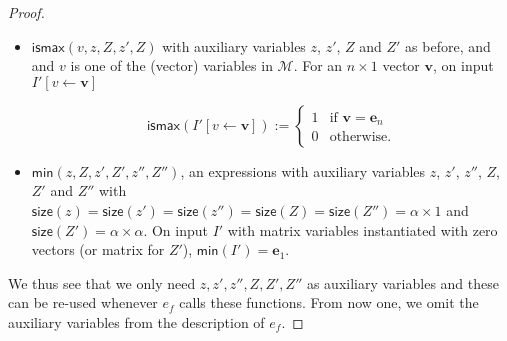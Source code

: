 \begin{proof}
\begin{itemize}
	\item $\textsf{ismax}(v,z,Z,z',Z)$ with auxiliary variables $z$, $z'$, $Z$ and $Z'$ as before, and 
	and $v$ is one of the (vector) variables in $\mathcal{M}$. For an $n\times 1$ vector $\mathbf{v}$, 
	on input $I'[v\gets \mathbf{v}]$
	
	$$\mathsf{ismax}(I'[v\gets\mathbf{v}]):=\begin{cases} 1 & \text{if $\mathbf{v}=\mathbf{e}_{n}$}\\
		0 & \text{otherwise}.
		\end{cases}$$
	\item $\mathsf{min}(z,Z,z',Z',z'',Z'')$, an expressions with
	auxiliary variables $z$, $z'$, $z''$, $Z$, $Z'$ and $Z''$ with 
	$\mathsf{size}(z)=\mathsf{size}(z')=\mathsf{size}(z'')=\mathsf{size}(Z)=\mathsf{size}(Z'')=\alpha\times 1$ 
	and $\mathsf{size}(Z')=\alpha\times\alpha$. On input $I'$ with 
	matrix variables instantiated with zero vectors (or matrix for $Z'$),
 	 $\mathsf{min}(I')=\mathbf{e}_1$. 
	 		
\end{itemize}
We thus see that we only need $z,z',z'',Z,Z',Z''$ as auxiliary variables and these can be re-used 
whenever $e_f$ calls these functions. From now one, we omit the auxiliary variables from the description 
of $e_f$.



\end{proof}
